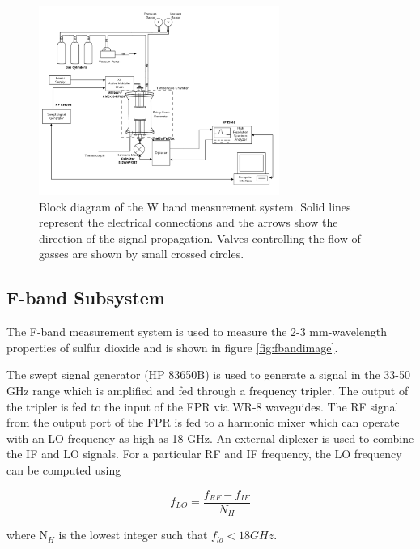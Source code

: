 \begin{figure}[H]
    \centering
	\includegraphics[width=0.7\textwidth]{./images/w-bandsystem.png}
	\caption{Block diagram of the W band measurement system. Solid lines represent the electrical connections and the arrows show the direction of the signal propagation. Valves controlling the flow of gasses are shown by small crossed circles.}
    \label{fig:wbandimage}
\end{figure}


\subsection{F-band Subsystem}
The F-band measurement system is used to measure the 2-3 mm-wavelength properties of sulfur dioxide and is shown in figure \ref{fig:fbandimage}.

The swept signal generator (HP 83650B) is used to generate a signal in the 33-50 GHz range which
is amplified and fed through a frequency tripler. The output of the tripler is fed to the input of the FPR via WR-8 waveguides. The RF signal from the output port of the FPR is fed to a harmonic mixer which can operate with an LO frequency as high as 18 GHz. An external diplexer is used to combine the IF and LO signals. For a particular RF and IF frequency,  the LO frequency can be computed using

\begin{equation} \label{eq:fbandlo}
f_{LO} = \frac{f_{RF} - f_{IF}}{N_H	}
\end{equation}

\noindent where N$_H$ is the lowest integer such that $f_{lo} < 18 GHz$.

